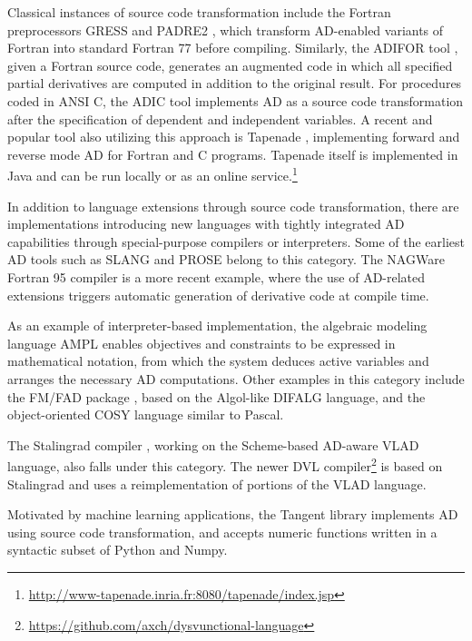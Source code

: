 \documentclass[twoside,11pt]{article}
\begin{document}
Classical instances of source code transformation include the Fortran preprocessors GRESS \citep{Horwedel1988} and PADRE2 \citep{Kubo1990}, which transform AD-enabled variants of Fortran into standard Fortran 77 before compiling. Similarly, the ADIFOR tool \citep{Bischof1996}, given a Fortran source code, generates an augmented code in which all specified partial derivatives are computed in addition to the original result. For procedures coded in ANSI C, the ADIC tool \citep{Bischof1997} implements AD as a source code transformation after the specification of dependent and independent variables. A recent and popular tool also utilizing this approach is Tapenade \citep{Pascual2008,Hascoet2013}, implementing forward and reverse mode AD for Fortran and C programs. Tapenade itself is implemented in Java and can be run locally or as an online service.\footnote{\url{http://www-tapenade.inria.fr:8080/tapenade/index.jsp}}

In addition to language extensions through source code transformation, there are implementations introducing new languages with tightly integrated AD capabilities through special-purpose compilers or interpreters. Some of the earliest AD tools such as SLANG \citep{Adamson1969} and PROSE \citep{Pfeiffer1987} belong to this category. The NAGWare Fortran 95 compiler \citep{Naumann2005} is a more recent example, where the use of AD-related extensions triggers automatic generation of derivative code at compile time.

As an example of interpreter-based implementation, the algebraic modeling language AMPL \citep{Fourer2002} enables objectives and constraints to be expressed in mathematical notation, from which the system deduces active variables and arranges the necessary AD computations. Other examples in this category include the FM/FAD package \citep{Mazourik1991}, based on the Algol-like DIFALG language, and the object-oriented COSY language \citep{Berz1996} similar to Pascal.

The Stalingrad compiler \citep{pearlmutter2008reverse,Siskind2008}, working on the Scheme-based AD-aware VLAD language, also falls under this category. The newer DVL compiler\footnote{\url{https://github.com/axch/dysvunctional-language}} is based on Stalingrad and uses a reimplementation of portions of the VLAD language.

Motivated by machine learning applications, the Tangent library \citep{van2017tangent} implements AD using source code transformation, and accepts numeric functions written in a syntactic subset of Python and Numpy.
\end{document}
